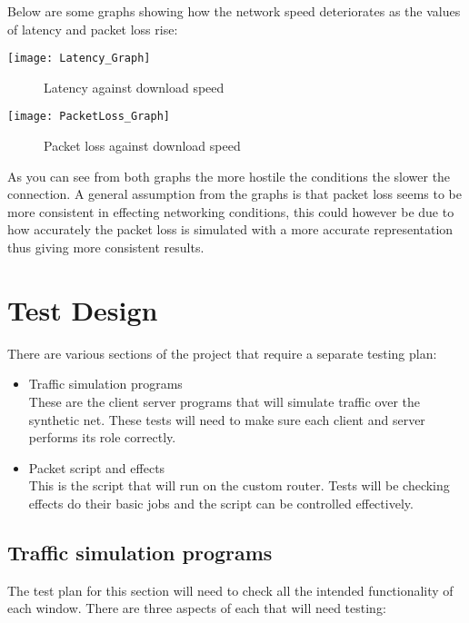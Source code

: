 Below are some graphs showing how the network speed deteriorates as the values of latency and packet loss rise:

\begin{center}
	\texttt{[image: Latency\_Graph]}
	\begin{figure}[h]
		\caption{Latency against download speed}
	\end{figure}
\end{center}

\begin{center}
	\texttt{[image: PacketLoss\_Graph]}
	\begin{figure}[h]
		\caption{Packet loss against download speed}
	\end{figure}
\end{center}

As you can see from both graphs the more hostile the conditions the slower the connection. A general assumption from the graphs is that packet loss seems to be more consistent in effecting networking conditions, this could however be due to how accurately the packet loss is simulated with a more accurate representation thus giving more consistent results.

\section{Test Design}
There are various sections of the project that require a separate testing plan:

\begin{itemize}
\item Traffic simulation programs\\
These are the client server programs that will simulate traffic over the synthetic net. These tests will need to make 	sure each client and server performs its role correctly.
\item Packet script and effects\\
This is the script that will run on the custom router. Tests will be checking effects do their basic jobs and the script can be controlled effectively.
\end{itemize}

\subsection{Traffic simulation programs}
The test plan for this section will need to check all the intended functionality of each window. There are three aspects of each that will need testing:


